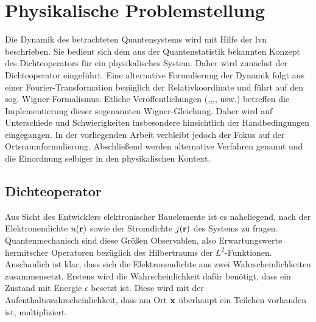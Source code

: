 \chapter{Physikalische Problemstellung}

Die Dynamik des betrachteten Quantensystems wird mit Hilfe der \ac{lvn} beschrieben. Sie bedient sich dem aus der Quantenstatistik bekannten Konzept des Dichteoperators für ein physikalisches System. Daher wird zunächst der Dichteoperator  eingeführt. Eine alternative Formulierung der Dynamik folgt aus einer Fourier-Transformation bezüglich der Relativkoordinate und führt auf den sog. Wigner-Formalismus. Etliche Veröffentlichungen (\cite{rossi1994monte},\cite{ringhofer},\cite{van2017efficient},\cite{schulz2016application},\cite{mains1988wigner} usw.) betreffen die Implementierung dieser sogenannten Wigner-Gleichung. Daher wird auf Unterschiede und Schwierigkeiten insbesondere hinsichtlich der Randbedingungen eingegangen. In der vorliegenden Arbeit verbleibt jedoch der Fokus auf der Ortsraumformulierung. Abschließend werden alternative Verfahren genannt und die Einordnung selbiger in den physikalischen Kontext.

\section{Dichteoperator} 
\label{sec:2_1}
Aus Sicht des Entwicklers elektronischer Bauelemente ist es naheliegend, nach der Elektronendichte $n(\vb{r})$ sowie der Stromdichte $j(\vb{r})$ des Systems zu fragen. Quantenmechanisch sind diese Größen Observablen, also Erwartungswerte hermitscher Operatoren bezüglich des Hilbertraums der $L^2$-Funktionen. Anschaulich ist klar, dass sich die Elektronendichte aus zwei Wahrscheinlichkeiten zusammensetzt. Erstens wird die Wahrscheinlichkeit dafür benötigt, dass ein Zustand mit Energie $\epsilon$ besetzt ist. Diese wird mit der Aufenthaltswahrscheinlichkeit, dass am Ort $\vb{x}$ überhaupt ein Teilchen vorhanden ist, multipliziert.

